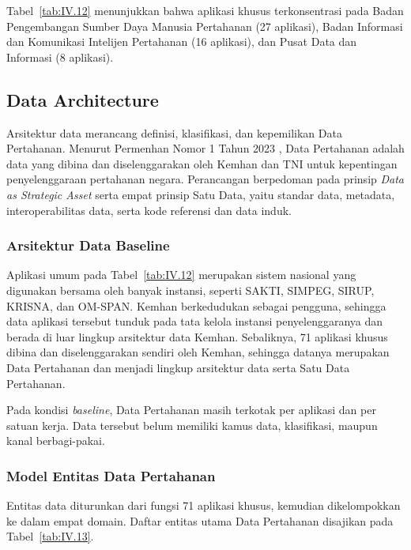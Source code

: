Tabel~\ref{tab:IV.12} menunjukkan bahwa aplikasi khusus terkonsentrasi pada Badan Pengembangan Sumber Daya Manusia Pertahanan (27 aplikasi), Badan Informasi dan Komunikasi Intelijen Pertahanan (16 aplikasi), dan Pusat Data dan Informasi (8 aplikasi).

\subsection{Data Architecture}
\label{sec:IV.4.1}

Arsitektur data merancang definisi, klasifikasi, dan kepemilikan Data Pertahanan. Menurut Permenhan Nomor 1 Tahun 2023 \cite{Permenhan1Tahun2023}, Data Pertahanan adalah data yang dibina dan diselenggarakan oleh Kemhan dan TNI untuk kepentingan penyelenggaraan pertahanan negara. Perancangan berpedoman pada prinsip \textit{Data as Strategic Asset} serta empat prinsip Satu Data, yaitu standar data, metadata, interoperabilitas data, serta kode referensi dan data induk.

\subsubsection{Arsitektur Data Baseline}
\label{sec:IV.4.1.1}

Aplikasi umum pada Tabel~\ref{tab:IV.12} merupakan sistem nasional yang digunakan bersama oleh banyak instansi, seperti SAKTI, SIMPEG, SIRUP, KRISNA, dan OM-SPAN. Kemhan berkedudukan sebagai pengguna, sehingga data aplikasi tersebut tunduk pada tata kelola instansi penyelenggaranya dan berada di luar lingkup arsitektur data Kemhan. Sebaliknya, 71 aplikasi khusus dibina dan diselenggarakan sendiri oleh Kemhan, sehingga datanya merupakan Data Pertahanan dan menjadi lingkup arsitektur data serta Satu Data Pertahanan.

Pada kondisi \textit{baseline}, Data Pertahanan masih terkotak per aplikasi dan per satuan kerja. Data tersebut belum memiliki kamus data, klasifikasi, maupun kanal berbagi-pakai.

\subsubsection{Model Entitas Data Pertahanan}
\label{sec:IV.4.1.2}

Entitas data diturunkan dari fungsi 71 aplikasi khusus, kemudian dikelompokkan ke dalam empat domain. Daftar entitas utama Data Pertahanan disajikan pada Tabel~\ref{tab:IV.13}.

